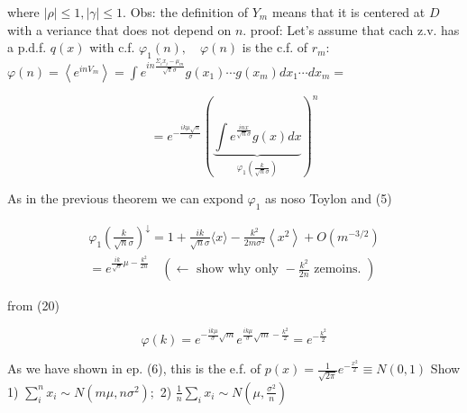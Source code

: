 where $|\rho| \leqslant 1,|\gamma| \leqslant 1$.
Obs: the definition of $Y_{m}$ means that it is centered at $D$ with a veriance that does not depend on $n$.
proof:
Let's assume that cach z.v. has a p.d.f. $q(x)$ with c.f. $\varphi_{1}(n), \quad \varphi(n)$ is the c.f. of $r_{m}$: 
$\varphi(n)=\left\langle e^{i n V_{m}}\right\rangle=\int e^{i n \frac{\Sigma_{i} x_{i}-\mu_{m}}{\sqrt{\pi} \sigma}} g\left(x_{1}\right) \cdots g\left(x_{m}\right) d x_{1} \cdots d x_{m}=$

\begin{equation*}
=e^{-\frac{i k \mu \sqrt{n}}{\sigma}}(\underbrace{\int e^{\frac{i n x}{\sqrt{n} \sigma}} g(x) d x}_{\varphi_{1}\left(\frac{k}{\sqrt{n} \sigma}\right)})^{n} \tag{20}
\end{equation*} 

As in the previous theorem we can expond $\varphi_{1}$ as noso
Toylon and (5)

$$ \begin{gathered}
\varphi_{1}\left(\frac{k}{\sqrt{n} \sigma}\right)^{\downarrow}=1+\frac{i k}{\sqrt{n} \sigma}\langle x\rangle-\frac{k^{2}}{2 m \sigma^{2}}\left\langle x^{2}\right\rangle+O\left(m^{-3 / 2}\right) \\ =e^{\frac{i k}{\sqrt{\sigma}} \mu-\frac{k^{2}}{2 n}} \quad(\leftarrow \text { show why only }-\frac{k^{2}}{2 n} \text { zemoins. })
\end{gathered} $$ 

from (20)

$$ \varphi(k)=e^{-\frac{i k \mu}{\sigma} \sqrt{m}} e^{\frac{i k \mu}{\sigma} \sqrt{m}-\frac{k^{2}}{2}}=e^{-\frac{k^{2}}{2}} $$ 

As we have shown in ep. (6), this is the e.f. of $p(x)=\frac{1}{\sqrt{2 \pi}} e^{-\frac{x^{2}}{2}} \equiv N(0,1)$ Show 1) $\sum_{i}^{n} x_{i} \sim N\left(m \mu, n \sigma^{2}\right) ;$ 2) $\frac{1}{n} \sum_{i} x_{i} \sim N\left(\mu, \frac{\sigma^{2}}{n}\right)$